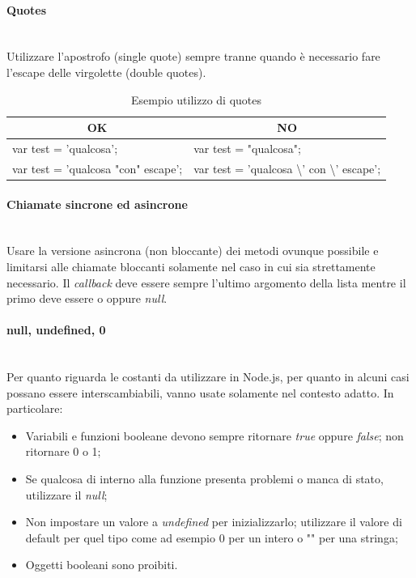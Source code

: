 \paragraph{Quotes}\mbox{}\\[0.4cm]
Utilizzare l'apostrofo (single quote) sempre tranne quando è necessario fare l'escape delle virgolette (double quotes).
\begin{table} [H]
	\begin{center}
		\begin{tabular}{ | l | l |}
			\multicolumn{1}{c}{\textbf{OK}}&\multicolumn{1}{c}{\textbf{NO}}\\ 
			\hline
			var test = 'qualcosa'; & var test = "qualcosa"; \\
			var test = 'qualcosa "con" escape'; & var test = 'qualcosa \textbackslash' con \textbackslash' escape';\\
			\hline
		\end{tabular}
	\end{center}
	\caption{Esempio utilizzo di quotes}
\end{table}

\paragraph{Chiamate sincrone ed asincrone}\mbox{}\\[0.4cm]
Usare la versione asincrona (non bloccante) dei metodi ovunque possibile e limitarsi alle chiamate bloccanti solamente nel caso in cui sia strettamente necessario. Il \textit{callback} deve essere sempre l'ultimo argomento della lista mentre il primo deve essere o  oppure \textit{null}.

\paragraph{null, undefined, 0}\mbox{}\\[0.4cm]
Per quanto riguarda le costanti da utilizzare in Node.js, per quanto in alcuni casi possano essere interscambiabili, vanno usate solamente nel contesto adatto. In particolare:

\begin{itemize}
    \item Variabili e funzioni booleane devono sempre ritornare \textit{true} oppure \textit{false}; non ritornare 0 o 1;
    \item Se qualcosa di interno alla funzione presenta problemi o manca di stato, utilizzare il \textit{null};
    \item Non impostare un valore a \textit{undefined} per inizializzarlo; utilizzare il valore di default per quel tipo come ad esempio 0 per un intero o "" per una stringa;
    \item Oggetti booleani sono proibiti.
\end{itemize}
